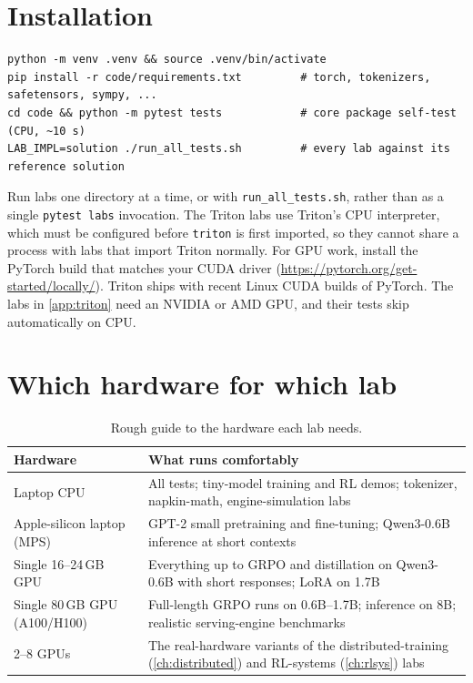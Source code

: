 \section{Installation}

\begin{lstlisting}[style=shell]
python -m venv .venv && source .venv/bin/activate
pip install -r code/requirements.txt         # torch, tokenizers, safetensors, sympy, ...
cd code && python -m pytest tests            # core package self-test (CPU, ~10 s)
LAB_IMPL=solution ./run_all_tests.sh         # every lab against its reference solution
\end{lstlisting}
Run labs one directory at a time, or with \texttt{run\_all\_tests.sh}, rather than as a single
\texttt{pytest labs} invocation. The Triton labs use Triton's CPU interpreter, which must be
configured before \texttt{triton} is first imported, so they cannot share a process with labs that
import Triton normally.
For GPU work, install the PyTorch build that matches your CUDA driver
(\url{https://pytorch.org/get-started/locally/}). Triton ships with recent Linux CUDA builds of
PyTorch. The labs in \cref{app:triton} need an NVIDIA or AMD GPU, and their tests skip
automatically on CPU.

\section{Which hardware for which lab}

\begin{table}[h]
\centering\small
\begin{tabularx}{\linewidth}{@{}lX@{}}
\toprule
\textbf{Hardware} & \textbf{What runs comfortably}\\
\midrule
Laptop CPU & All tests; tiny-model training and RL demos; tokenizer, napkin-math, engine-simulation labs\\
Apple-silicon laptop (MPS) & GPT-2 small pretraining and fine-tuning; Qwen3-0.6B inference at short contexts\\
Single 16--24\,GB GPU & Everything up to GRPO and distillation on Qwen3-0.6B with short responses; LoRA on 1.7B\\
Single 80\,GB GPU (A100/H100) & Full-length GRPO runs on 0.6B--1.7B; inference on 8B; realistic serving-engine benchmarks\\
2--8 GPUs & The real-hardware variants of the distributed-training (\cref{ch:distributed}) and RL-systems (\cref{ch:rlsys}) labs\\
\bottomrule
\end{tabularx}
\caption{Rough guide to the hardware each lab needs.}
\end{table}

